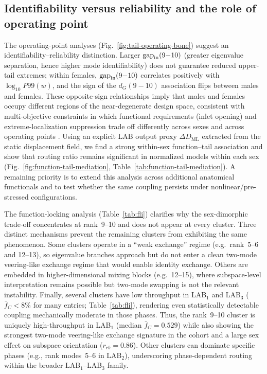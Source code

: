 \documentclass[11pt]{article}
\begin{document}
\subsection*{Identifiability versus reliability and the role of operating point}
The operating-point analyses (Fig.~\ref{fig:tail-operating-bone}) suggest an identifiability--reliability distinction.
Larger $\mathrm{gap}_{\rm in}(9{-}10)$ (greater eigenvalue separation, hence higher mode identifiability) does not guarantee reduced upper-tail extremes; within females, $\mathrm{gap}_{\rm in}(9{-}10)$ correlates positively with $\log_{10}P99(w)$, and the sign of the $d_G(9{-}10)$ association flips between males and females.
These opposite-sign relationships imply that males and females occupy different regions of the near-degenerate design space, consistent with multi-objective constraints in which functional requirements (inlet opening) and extreme-localization suppression trade off differently across sexes and across operating points \citep{Whitcome2017,Washburn1960}.
Using an explicit LAB output proxy $\Delta D_{\mathrm{ML}}$ extracted from the static displacement field, we find a strong within-sex function--tail association and show that routing ratio remains significant in normalized models within each sex (Fig.~\ref{fig:function-tail-mediation}, Table~\ref{tab:function-tail-mediation}).
A remaining priority is to extend this analysis across additional anatomical functionals and to test whether the same coupling persists under nonlinear/pre-stressed configurations.

The function-locking analysis (Table~\ref{tab:fli}) clarifies why the sex-dimorphic trade-off concentrates at rank~9--10 and does not appear at every cluster.
Three distinct mechanisms prevent the remaining clusters from exhibiting the same phenomenon.
Some clusters operate in a ``weak exchange'' regime (e.g.\ rank~5--6 and 12--13), so eigenvalue branches approach but do not enter a clean two-mode veering-like exchange regime that would enable identity exchange.
Others are embedded in higher-dimensional mixing blocks (e.g.\ 12--15), where subspace-level interpretation remains possible but two-mode swapping is not the relevant instability.
Finally, several clusters have low throughput in LAB$_1$ and LAB$_3$ ($\bar f_C<8\%$ for many entries; Table~\ref{tab:fli}), rendering even statistically detectable coupling mechanically moderate in those phases.
Thus, the rank~9--10 cluster is uniquely high-throughput in LAB$_1$ (median $\bar f_C=0.529$) while also showing the strongest two-mode veering-like exchange signature in the cohort and a large sex effect on subspace orientation ($r_{rb} = 0.86$).
Other clusters can dominate specific phases (e.g., rank modes~5--6 in LAB$_2$), underscoring phase-dependent routing within the broader LAB$_1$--LAB$_3$ family.
\end{document}
